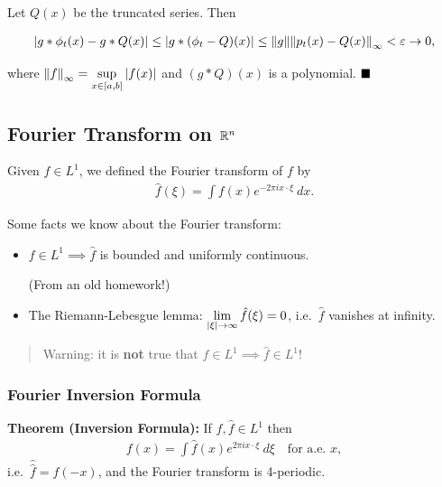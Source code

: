 Let \(Q(x)\) be the truncated series. Then

\begin{align*}
{\left\lvert {g\ast\phi_t(x) - g\ast Q(x)} \right\rvert} \leq {\left\lvert {g\ast(\phi_t - Q)(x)} \right\rvert} \leq {\left\lVert {g} \right\rVert} {\left\lVert {p_t(x) - Q(x)} \right\rVert}_\infty < \varepsilon \to 0,
\end{align*}

where \({\left\lVert {f} \right\rVert}_\infty = \displaystyle\sup_{x\in [a, b]} {\left\lvert {f(x)} \right\rvert}\)
and \((g\ast Q)(x)\) is a polynomial. \(\qed\)

\hypertarget{fourier-transform-on-rrn}{%
\subsection{\texorpdfstring{Fourier Transform on
\({\mathbb{R}}^n\)}{Fourier Transform on \textbackslash RR\^{}n}}\label{fourier-transform-on-rrn}}

Given \(f\in L^1\), we defined the Fourier transform of \(f\) by
\begin{align*}
\hat{f}(\xi) = \int f(x) e^{-2\pi i x\cdot \xi}~dx
.\end{align*}

Some facts we know about the Fourier transform:

\begin{itemize}
\item
  \(f\in L^1 \implies \hat{f}\) is bounded and uniformly continuous.

  (From an old homework!)
\item
  The Riemann-Lebesgue lemma:
  \(\displaystyle\lim_{{\left\lvert {\xi} \right\rvert} \to \infty} \hat{f}(\xi) = 0\),
  i.e.~\(\hat{f}\) vanishes at infinity.
\end{itemize}

\begin{quote}
Warning: it is \textbf{not} true that
\(f \in L^1 \implies \hat{f}\in L^1\)!
\end{quote}

\hypertarget{fourier-inversion-formula}{%
\subsubsection{Fourier Inversion
Formula}\label{fourier-inversion-formula}}

\textbf{Theorem (Inversion Formula):} If \(f, \hat{f} \in L^1\) then
\begin{align*}
f(x) = \int \hat{f} (x) e^{2\pi i x\cdot \xi} ~d\xi \quad \text{for a.e. } x,
\end{align*} i.e.~\(\hat{\hat{f}} = f(-x)\), and the Fourier transform
is 4-periodic.

